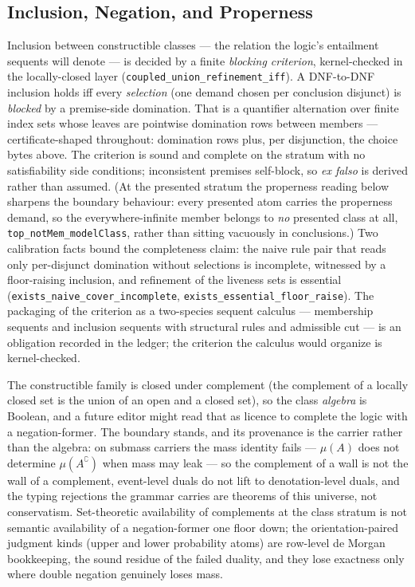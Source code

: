 \subsection{Inclusion, Negation, and Properness}

Inclusion between constructible classes --- the relation the
logic's entailment sequents will denote --- is decided by a finite
\emph{blocking criterion}, kernel-checked in the locally-closed
layer (\texttt{coupled\_union\_refinement\_iff}). A DNF-to-DNF
inclusion holds iff every \emph{selection} (one demand chosen per
conclusion disjunct) is \emph{blocked} by a premise-side
domination. That is a quantifier alternation over finite index
sets whose leaves are pointwise domination rows between members
--- certificate-shaped throughout: domination rows plus, per
disjunction, the choice bytes above. The criterion is sound and
complete on the stratum with no satisfiability side conditions;
inconsistent premises self-block, so \emph{ex falso} is derived
rather than assumed. (At the presented stratum the properness
reading below sharpens the boundary behaviour: every presented
atom carries the properness demand, so the everywhere-infinite
member belongs to \emph{no} presented class at all,
\texttt{top\_notMem\_modelClass}, rather than sitting vacuously in
conclusions.) Two calibration facts bound the completeness claim:
the naive rule pair that reads only per-disjunct domination
without selections is incomplete, witnessed by a floor-raising
inclusion, and refinement of the liveness sets is essential
(\texttt{exists\_naive\_cover\_incomplete},
\texttt{exists\_essential\_floor\_raise}). The packaging of the
criterion as a two-species sequent calculus --- membership
sequents and inclusion sequents with structural rules and
admissible cut --- is an obligation recorded in the ledger; the
criterion the calculus would organize is kernel-checked.

\begin{remark}
\label{rem:su-negation-fence}
The constructible family is closed under complement (the
complement of a locally closed set is the union of an open and a
closed set), so the class \emph{algebra} is Boolean, and a future
editor might read that as licence to complete the logic with a
negation-former. The boundary stands, and its provenance is the
carrier rather than the algebra: on submass carriers the mass
identity fails --- $\mu(A)$ does not determine
$\mu(A^{\complement})$ when mass may leak --- so the complement of
a wall is not the wall of a complement, event-level duals do not
lift to denotation-level duals, and the typing rejections the
grammar carries are theorems of this universe, not conservatism.
Set-theoretic availability of complements at the class stratum is
not semantic availability of a negation-former one floor down; the
orientation-paired judgment kinds (upper and lower probability
atoms) are row-level de Morgan bookkeeping, the sound residue of
the failed duality, and they lose exactness only where double
negation genuinely loses mass.
\end{remark}

